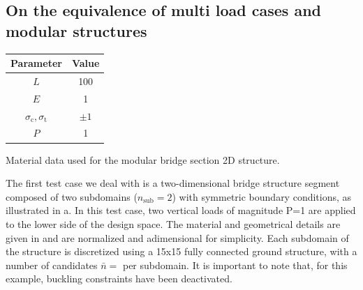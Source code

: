 \subsection{On the equivalence of multi load cases and modular structures}
\begin{margintable}
    \small
    \centering
    \begin{tabular}{cc}
    \toprule
    \textbf{Parameter}        & \textbf{Value} \\ \midrule
    $L$              & 100     \\
    $E$              & 1     \\
    $\sigma_\text{c}, \sigma_\text{t}$ & $\pm 1$\\
    $P$              & 1   \\
    \bottomrule
    \end{tabular}
    \caption{Material data used for the modular bridge section 2D structure.}
    \label{tab:05_modular_data}
\end{margintable}
The first test case we deal with is a two-dimensional bridge structure segment composed of two subdomains ($n_{\text{sub}} = 2$) with symmetric boundary conditions, as illustrated in a. In this test case, two vertical loads of magnitude P=1 are applied to the lower side of the design space. The material and geometrical details are given in  and are normalized and adimensional for simplicity. Each subdomain of the structure is discretized using a 15x15 fully connected ground structure, with a number of candidates $\bar{n}=$ per subdomain. It is important to note that, for this example, buckling constraints have been deactivated.

